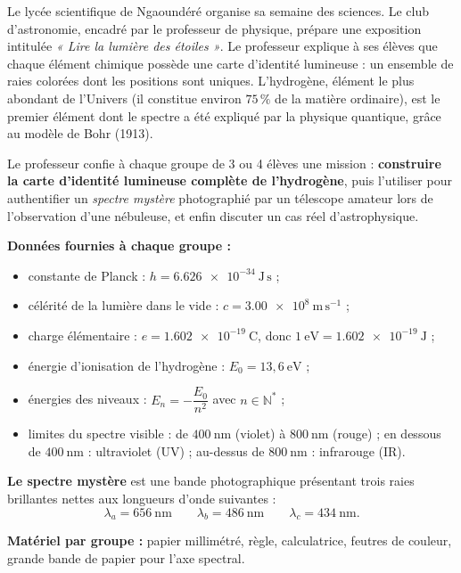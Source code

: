 \documentclass[11pt]{article}
\newcommand{\cle}[1]{{\popxbold\color{popdark}#1}}
\newcounter{popsec}
\newcounter{popsub}
\newcommand{\courssub}[1]{%
  \stepcounter{popsub}%
  \par\vspace{9pt}\noindent{\popxbold\fontsize{11.5}{13}\selectfont\color{popink}{\color{poporange}\thepopsec.\thepopsub}\hspace{6pt}#1}\par\nopagebreak\vspace{4pt}
}
\begin{document}
\courssub{Situation}

Le lycée scientifique de Ngaoundéré organise sa semaine des sciences. Le club d'astronomie, encadré par le professeur de physique, prépare une exposition intitulée \emph{« Lire la lumière des étoiles »}. Le professeur explique à ses élèves que chaque élément chimique possède une \cle{carte d'identité lumineuse} : un ensemble de raies colorées dont les positions sont uniques. L'hydrogène, élément le plus abondant de l'Univers (il constitue environ $75\,\%$ de la matière ordinaire), est le premier élément dont le spectre a été expliqué par la physique quantique, grâce au modèle de Bohr (1913).

Le professeur confie à chaque groupe de 3 ou 4 élèves une mission : \textbf{construire la carte d'identité lumineuse complète de l'hydrogène}, puis l'utiliser pour authentifier un \emph{spectre mystère} photographié par un télescope amateur lors de l'observation d'une nébuleuse, et enfin discuter un cas réel d'astrophysique.

\textbf{Données fournies à chaque groupe :}
\begin{itemize}
\item constante de Planck : $h = \num{6,626e-34}\ \mathrm{J\,s}$ ;
\item célérité de la lumière dans le vide : $c = \num{3,00e8}\ \mathrm{m\,s^{-1}}$ ;
\item charge élémentaire : $e = \num{1,602e-19}\ \mathrm{C}$, donc $1\ \mathrm{eV} = \num{1,602e-19}\ \mathrm{J}$ ;
\item énergie d'ionisation de l'hydrogène : $E_0 = 13,6\ \mathrm{eV}$ ;
\item énergies des niveaux : $E_n = -\dfrac{E_0}{n^2}$ avec $n \in \mathbb{N}^*$ ;
\item limites du spectre visible : de $400\ \mathrm{nm}$ (violet) à $800\ \mathrm{nm}$ (rouge) ; en dessous de $400\ \mathrm{nm}$ : ultraviolet (UV) ; au-dessus de $800\ \mathrm{nm}$ : infrarouge (IR).
\end{itemize}

\textbf{Le spectre mystère} est une bande photographique présentant trois raies brillantes nettes aux longueurs d'onde suivantes :
\[
\lambda_a = 656\ \mathrm{nm} \qquad \lambda_b = 486\ \mathrm{nm} \qquad \lambda_c = 434\ \mathrm{nm}.
\]

\textbf{Matériel par groupe :} papier millimétré, règle, calculatrice, feutres de couleur, grande bande de papier pour l'axe spectral.

\courssub{Consignes}
\end{document}

